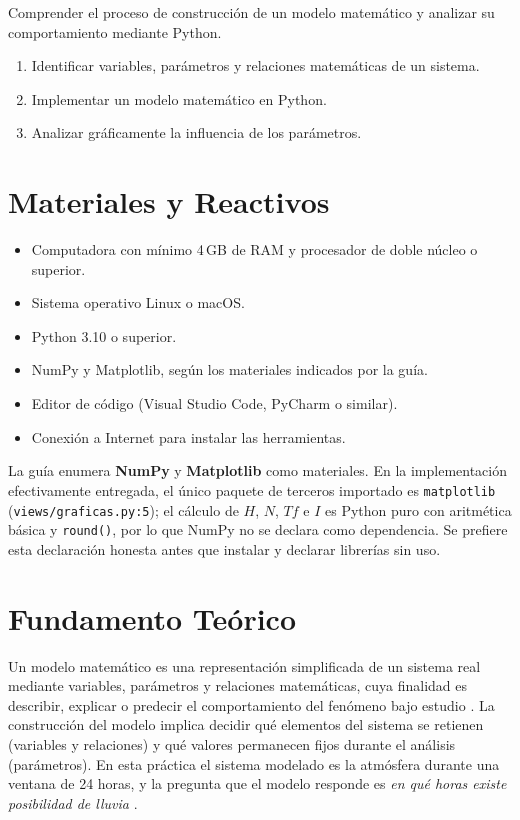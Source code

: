 \documentclass[11pt,a4paper]{article}
\begin{document}
Comprender el proceso de construcci\'on de un modelo matem\'atico y analizar su
comportamiento mediante Python.

\begin{enumerate}[leftmargin=*]
  \item Identificar variables, par\'ametros y relaciones matem\'aticas de un sistema.
  \item Implementar un modelo matem\'atico en Python.
  \item Analizar gr\'aficamente la influencia de los par\'ametros.
\end{enumerate}

\section{Materiales y Reactivos}

\begin{itemize}[leftmargin=*]
  \item Computadora con m\'inimo 4\,GB de RAM y procesador de doble n\'ucleo o superior.
  \item Sistema operativo Linux o macOS.
  \item Python 3.10 o superior.
  \item NumPy y Matplotlib, seg\'un los materiales indicados por la gu\'ia.
  \item Editor de c\'odigo (Visual Studio Code, PyCharm o similar).
  \item Conexi\'on a Internet para instalar las herramientas.
\end{itemize}

La gu\'ia enumera \textbf{NumPy} y \textbf{Matplotlib} como materiales. En la
implementaci\'on efectivamente entregada, el \'unico paquete de terceros importado es
\texttt{matplotlib} (\texttt{views/graficas.py:5}); el c\'alculo de $H$, $N$, $Tf$ e $I$
es Python puro con aritm\'etica b\'asica y \texttt{round()}, por lo que NumPy no se
declara como dependencia. Se prefiere esta declaraci\'on honesta antes que instalar y
declarar librer\'ias sin uso.

\section{Fundamento Te\'orico}

Un modelo matem\'atico es una representaci\'on simplificada de un sistema real mediante
variables, par\'ametros y relaciones matem\'aticas, cuya finalidad es describir,
explicar o predecir el comportamiento del fen\'omeno bajo estudio
\cite{lawkelton2015,banks2010}. La construcci\'on del modelo implica decidir qu\'e
elementos del sistema se retienen (variables y relaciones) y qu\'e valores permanecen
fijos durante el an\'alisis (par\'ametros). En esta pr\'actica el sistema modelado es la
atm\'osfera durante una ventana de 24 horas, y la pregunta que el modelo responde es
\emph{en qu\'e horas existe posibilidad de lluvia} \cite{diaposSemana1}.
\end{document}
